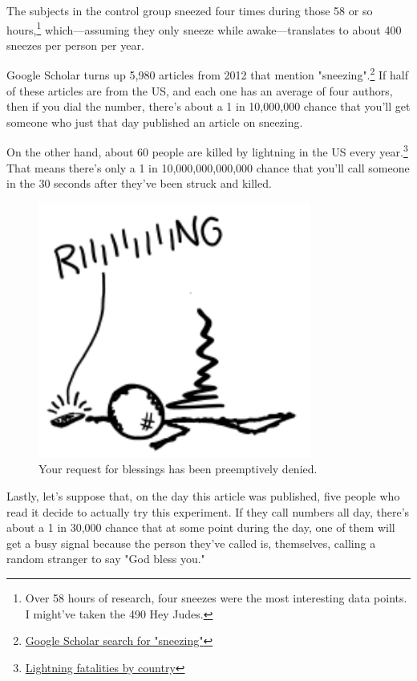 {{The subjects in the control group sneezed four times during those 58 or so hours,{\footnote{Over 58 hours of research, four sneezes were the most interesting data points. I might've taken the 490 Hey Judes.} } which—assuming they only sneeze while awake—translates to about 400 sneezes per person per year.}

{Google Scholar turns up 5,980 articles from 2012 that mention "sneezing".{\footnote{ \href{http://scholar.google.com/scholar?q=sneezing&hl=en&as\_sdt=1\%2C22&as\_ylo=2012&as\_yhi=2012}{Google Scholar search for "sneezing"}} } If half of these articles are from the US, and each one has an average of four authors, then if you dial the number, there's about a 1 in 10,000,000 chance that you'll get someone who just that day published an article on sneezing.}

{On the other hand, about 60 people are killed by lightning in the US every year.{\footnote{ \href{http://www.vaisala.com/Vaisala\%20Documents/Scientific\%20papers/Annual\_rates\_of\_lightning\_fatalities\_by\_country.pdf}{Lightning fatalities by country}} } That means there's only a 1 in 10,000,000,000,000 chance that you'll call someone in the 30 seconds after they've been struck and killed.}

\begin{figure}[!htbp]
\centering
\includegraphics[scale=0.5, max width=0.8\textwidth]{imgs/a/55/sneeze_lightning.png}
\caption{Your request for blessings has been preemptively denied.}
\end{figure}

{Lastly, let's suppose that, on the day this article was published, five people who read it decide to actually try this experiment. If they call numbers all day, there's about a 1 in 30,000 chance that at some point during the day, one of them will get a busy signal because the person they've called is, themselves, calling a random stranger to say "God bless you."}

}
